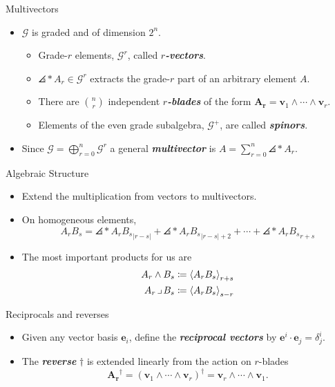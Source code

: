 \documentclass[aspectratio=169,handout]{beamer}
\newcommand\boldgreen[1]{\textcolor{lighter_csu_green}{\emph{\textbf{#1}}}}
\newcommand{\G}{\mathcal{G}}
\newcommand{\blade}[1]{\boldsymbol{#1}}
\newcommand{\contract}{\hspace*{.5mm} \lrcorner \hspace*{.5mm}}
\DeclarePairedDelimiter\angles{\langle}{\rangle}
\newcommand{\proj}[2]{\angles*{#2}_{#1}}
\begin{document}
\begin{frame}{Multivectors}
\vfill
\begin{itemize}
    \pause
        \item $\G$ is graded and of dimension $2^n$.
    \begin{itemize}
        \pause
        \item Grade-$r$ elements, $\G^r$, called \boldgreen{$r$-vectors}.
        \pause
        \item $\proj{r}{A}\in \G^r$ extracts the grade-$r$ part of an arbitrary element $A$.
        \pause
        \item There are ${n \choose r}$ independent \boldgreen{$r$-blades} of the form $\blade{A_r}=\blade{v}_1 \wedge \cdots \wedge\blade{v}_r$.
        \pause
        \item Elements of the even grade subalgebra, $\G^+$, are called \boldgreen{spinors}.
    \end{itemize}
        \pause
        \item Since $\displaystyle{\G=\bigoplus_{r=0}^n \G^r}$ a general \boldgreen{multivector} is $\displaystyle{A = \sum_{r=0}^n \proj{r}{A}}$.
\end{itemize}

\begin{figure}[H]
    \centering
    \def\svgwidth{\columnwidth}
\resizebox{.8\textwidth}{!}{}
\end{figure}
\vfill
\end{frame}

\begin{frame}{Algebraic Structure}
\vfill
\begin{itemize}
\pause
\item Extend the multiplication from vectors to multivectors.
\pause
\item On homogeneous elements,
\[
A_r B_s = \proj{|r-s|}{A_r B_s} + \proj{|r-s|+2}{A_r B_s} + \cdots + \proj{r+s}{A_r B_s}
\]
\pause
\item The most important products for us are
\begin{align*}
A_r \wedge B_s &\coloneqq \proj{r+s}{A_r B_s}\\
{A_r} \contract B_s &\coloneqq \proj{s-r}{A_r B_s}
\end{align*}
\end{itemize}
\vfill
\end{frame}

\begin{frame}{Reciprocals and reverses}
\vfill
\begin{itemize}
\pause
\item Given any vector basis $\blade{e}_i$, define the \boldgreen{reciprocal vectors} by $\blade{e}^i\cdot \blade{e}_j = \delta^i_j$.
\pause
\item The \boldgreen{reverse} $\dagger$ is extended linearly from the action on $r$-blades
\[
\blade{A_r}^\dagger = (\blade{v}_1 \wedge \cdots \wedge\blade{v}_r)^\dagger = \blade{v}_r \wedge \cdots \wedge\blade{v}_1.
\]
\end{itemize}
\vfill
\end{frame}
\end{document}
